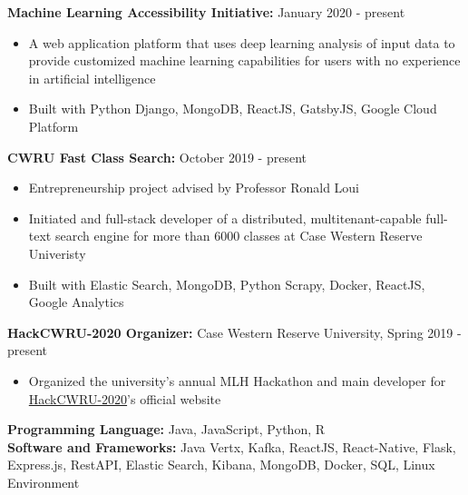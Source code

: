 \documentclass[a4paper,11pt]{article}
\begin{document}
\begin{flushleft}
	
	\textbf{Machine Learning Accessibility Initiative:} January 2020 - present
	\vspace{-\topsep}
	\begin{itemize}
		\setlength{\itemsep}{0pt plus 1pt}
		\item A web application platform that uses deep learning analysis of input data to provide customized machine learning capabilities for users with no experience in artificial intelligence
		\item Built with Python Django, MongoDB, ReactJS, GatsbyJS, Google Cloud Platform
	\end{itemize}
	
	
	\textbf{CWRU Fast Class Search:} October 2019 - present
	\vspace{-\topsep}
	\begin{itemize}
		\setlength{\itemsep}{0pt plus 1pt}
		\item Entrepreneurship project advised by Professor Ronald Loui
		\item Initiated and full-stack developer of a distributed, multitenant-capable full-text search engine for more than 6000 classes at Case Western Reserve Univeristy
		\item Built with Elastic Search, MongoDB, Python Scrapy, Docker, ReactJS, Google Analytics
	\end{itemize}
	
	

\end{flushleft}
\begin{flushleft}
	
	\textbf{HackCWRU-2020 Organizer: } Case Western Reserve University, Spring 2019 - 
	present
	\vspace{-\topsep}
	\begin{itemize}
		\setlength{\parskip}{2pt}
		\setlength{\itemsep}{0pt plus 1pt}
		\item Organized the university's annual MLH Hackathon and main developer for \href{https://hackcwru.info}{HackCWRU-2020}'s official website   \\
	\end{itemize}


	
\centering{\noindent\makebox{\rule{8cm}{1.5pt}}}
\end{flushleft} 
\begin{flushleft}
	\textbf{Programming Language:} Java, JavaScript, Python, R \\ 
	\doublespacing
	\textbf{Software and Frameworks:} Java Vertx, Kafka, ReactJS, React-Native, Flask, Express.js, RestAPI, Elastic Search, Kibana, MongoDB, Docker, SQL, Linux Environment\\
	\vspace{-\topsep}
	
\end{flushleft}
\end{document}
